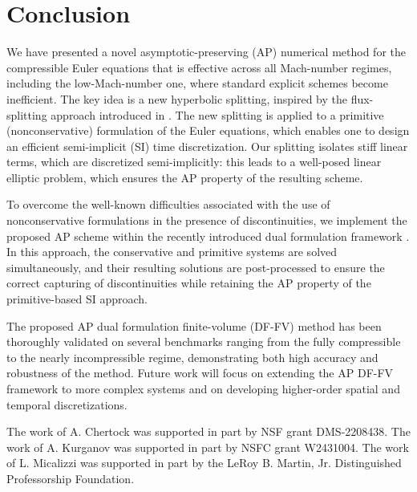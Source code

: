 \documentclass[A4paper,12pt,twoside]{article}
\newenvironment{acknowledgment}{{\flushleft \bf Acknowledgment:}}{}
\numberwithin{equation}{section}
\numberwithin{figure}{section}
\numberwithin{table}{section}
\begin{document}
\section{Conclusion}\label{sec5}
We have presented a novel asymptotic-preserving (AP) numerical method for the compressible Euler equations that is effective across all
Mach-number regimes, including the low-Mach-number one, where standard explicit schemes become inefficient. The key idea is a new 
hyperbolic splitting, inspired by the flux-splitting approach introduced in \cite{haack2012all}. The new splitting is applied to a 
primitive (nonconservative) formulation of the Euler equations, which enables one to design an efficient semi-implicit (SI) time 
discretization. Our splitting isolates stiff linear terms, which are discretized semi-implicitly: this leads to a well-posed linear 
elliptic problem, which ensures the AP property of the resulting scheme.
	
To overcome the well-known difficulties associated with the use of nonconservative formulations in the presence of discontinuities, we
implement the proposed AP scheme within the recently introduced dual formulation framework \cite{CFKM,ACKM}. In this approach, the
conservative and primitive systems are solved simultaneously, and their resulting solutions are post-processed to ensure the correct
capturing of discontinuities while retaining the AP property of the primitive-based SI approach.
	
The proposed AP dual formulation finite-volume (DF-FV) method has been thoroughly validated on several benchmarks ranging from the fully
compressible to the nearly incompressible regime, demonstrating both high accuracy and robustness of the method. Future work will focus on
extending the AP DF-FV framework to more complex systems and on developing higher-order spatial and temporal discretizations.
	
\begin{acknowledgment}
The work of A. Chertock was supported in part by NSF grant DMS-2208438. The work of A. Kurganov was supported in part by NSFC grant
W2431004. The work of L. Micalizzi was supported in part by the LeRoy B. Martin, Jr. Distinguished Professorship Foundation.
\end{acknowledgment}



\end{document}
